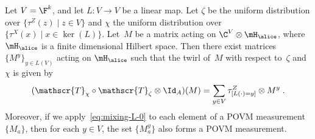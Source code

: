 \begin{lemma}
  \label{lem:mixing-L}
  Let $V= \F^k$, and let $L : V \rightarrow V$ be a linear map.
  Let $\zeta$ be the uniform distribution over $\{\tau^Z(z) \mid z \in V\}$ and
  $\chi$ the uniform distribution over $\{\tau^X(x) \mid x \in \ker(L)\}$.
  Let~$M$ be a matrix acting on $\C^V \otimes \mH_\alice$, where $\mH_\alice$ is
  a finite dimensional Hilbert space.
  Then there exist matrices $\{M^y\}_{y\in L(V)}$ acting on $\mH_\alice$ such
  that the twirl of~$M$ with respect to~$\zeta$ and~$\chi$ is given by
  \begin{equation}
    \label{eq:mixing-L-0}
    (\mathscr{T}_{\chi} \circ \mathscr{T}_{\zeta} \otimes \Id_A)(M) = \sum_{y\in
      V} \tau^Z_{[L(\cdot)= y]} \otimes M^y\;.
  \end{equation}
	Moreover, if we apply~\eqref{eq:mixing-L-0} to each element of a POVM
  measurement $\{M_a\}$, then for each $y \in V$, the set $\{M^y_a\}$ also forms
  a POVM measurement.
\end{lemma}

